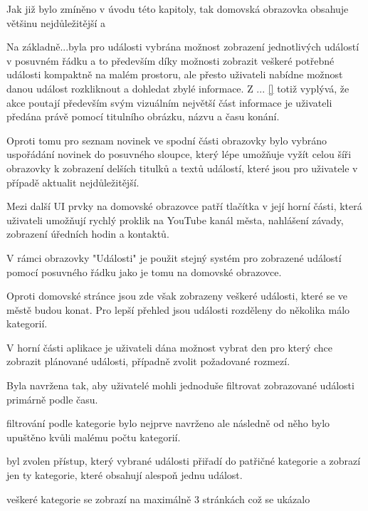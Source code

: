 \pagebreak
\begin{minipage}[t]{0.45\textwidth}
  Jak již bylo zmíněno v úvodu této kapitoly, tak domovská obrazovka obsahuje většinu nejdůležitější a 
  
  Na základně...byla pro události vybrána možnost zobrazení jednotlivých událostí v posuvném řádku a to především díky možnosti zobrazit
  veškeré potřebné události kompaktně na malém prostoru, ale přesto uživateli nabídne možnost danou událost rozkliknout a dohledat zbylé informace.
  Z ... \ref{} totiž vyplývá, že akce poutají především svým vizuálním největší část informace je uživateli předána právě pomocí titulního obrázku, názvu
  a času konání.
  
  Oproti tomu pro seznam novinek ve spodní části obrazovky bylo vybráno uspořádání novinek do posuvného sloupce, který lépe umožňuje 
  vyžít celou šíři obrazovky k zobrazení delších titulků a textů událostí, které jsou pro uživatele v případě aktualit nejdůležitější.
  
  Mezi další UI prvky na domovské obrazovce patří tlačítka v její horní části, která uživateli umožňují rychlý proklik na YouTube kanál města,
  nahlášení závady, zobrazení úředních hodin a kontaktů.
  
  
  
  \bigskip
  V rámci obrazovky "Události" je použit stejný systém pro zobrazené událostí pomocí posuvného řádku jako je tomu na domovské obrazovce.
  
  Oproti domovské stránce jsou zde však zobrazeny veškeré události, které se ve městě budou konat. Pro lepší přehled jsou události rozděleny 
  do několika málo kategorií.
  
  V horní části aplikace je uživateli dána možnost vybrat den pro který chce zobrazit plánované události, případně zvolit požadované rozmezí.
  
  
  
  Byla navržena tak, aby uživatelé mohli jednoduše filtrovat zobrazované události primárně podle času.
  
  filtrování podle kategorie bylo nejprve navrženo ale následně od něho bylo upuštěno kvůli malému počtu kategorií.
  
  byl zvolen přístup, který vybrané události přiřadí do patřičné kategorie a zobrazí jen ty kategorie, které obsahují alespoň jednu událost.
  
  veškeré kategorie se zobrazí na maximálně 3 stránkách což se ukázalo
\end{minipage}
